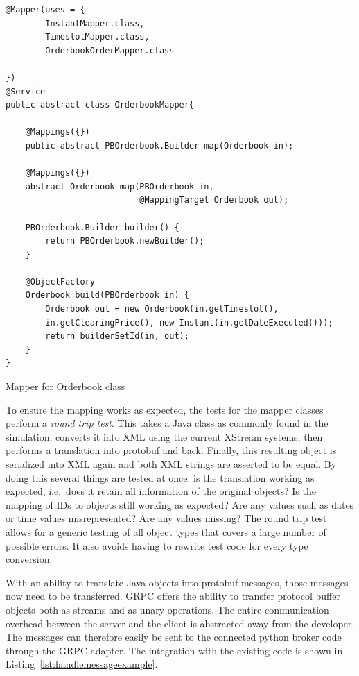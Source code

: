 \begin{listing}[ht]
    \begin{verbatim}
@Mapper(uses = {
        InstantMapper.class,
        TimeslotMapper.class,
        OrderbookOrderMapper.class

})
@Service
public abstract class OrderbookMapper{

    @Mappings({})
    public abstract PBOrderbook.Builder map(Orderbook in);

    @Mappings({})
    abstract Orderbook map(PBOrderbook in,
                           @MappingTarget Orderbook out);

    PBOrderbook.Builder builder() {
        return PBOrderbook.newBuilder();
    }

    @ObjectFactory
    Orderbook build(PBOrderbook in) {
        Orderbook out = new Orderbook(in.getTimeslot(),
        in.getClearingPrice(), new Instant(in.getDateExecuted()));
        return builderSetId(in, out);
    }
}
    \end{verbatim}
    \caption{Mapper for Orderbook class}
    \label{lst:mapperexample}
\end{listing}

To ensure the mapping works as expected, the tests for the mapper classes perform a \emph{round trip test}. This takes a
Java class as commonly found in the simulation, converts it into \ac{XML} using the current XStream systems, then
performs a translation into protobuf  and back. Finally, this resulting object is serialized into \ac{XML} again and
both \ac{XML} strings are asserted to be equal. By doing this several things are tested at once: is the translation
working as expected, i.e.\ does it retain all information of the original objects? Is the mapping of IDs to objects
still working as expected? Are any values such as dates or time values misrepresented? Are any values missing? The round
trip test allows for a generic testing of all object types that covers a large number of possible errors. It also avoids
having to rewrite test code for every type conversion.

With an ability to translate Java objects into protobuf messages, those messages now need to be transferred. \ac{GRPC}
offers the ability to transfer protocol buffer objects both as streams and as unary operations. The entire communication
overhead between the server and the client is abstracted away from the developer. The messages can therefore easily be
sent to the connected python broker code through the \ac{GRPC} adapter. The integration with the existing code is shown
in Listing~\ref{lst:handlemessageexample}.

